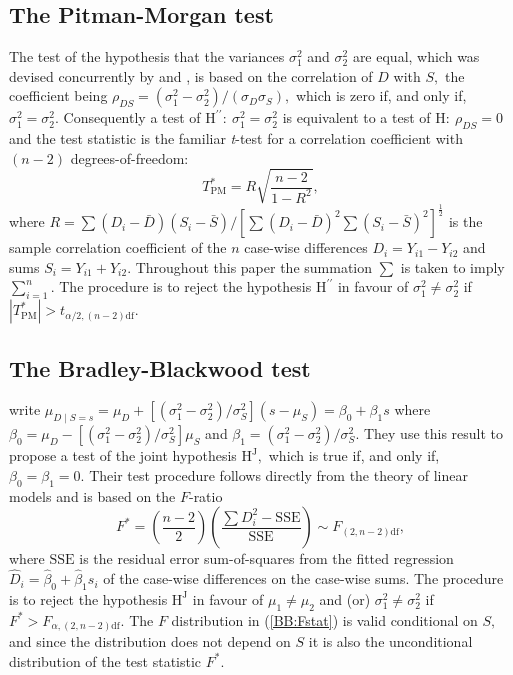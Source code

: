 \documentclass[12pt, a4paper]{report}
\theoremstyle{plain}
\theoremstyle{definition}
\theoremstyle{remark}
\begin{document}
\subsection{The Pitman-Morgan test}

The test of the hypothesis that the variances $\sigma^2_1$ and $\sigma^2_2$ are equal, which was devised concurrently by \cite{Pit39} and \cite{Morgan39}, is based on the correlation of $D$ with $S,$ the coefficient being $\rho_{DS} = (\sigma^2_1 - \sigma^2_2) / (\sigma_D \sigma_S ),$ which is zero if, and only if, $\sigma^2_1 = \sigma^2_2.$ Consequently a test of $\textrm{H}^{\prime\prime}\colon\ \sigma^2_1 = \sigma^2_2$ is equivalent to a test of $\textrm{H}\colon\ \rho_{DS}=0$ and the test statistic is the familiar {\it t}-test for a correlation coefficient with $(n-2)$ degrees-of-freedom:  
\[
T^*_\mathrm{PM} = R \sqrt{ \frac{n-2}{1-R^2} },
\]
where $R =  \sum (D_i-\bar{D})(S_i-\bar{S}) / [ \sum(D_i-\bar{D})^2 \sum (S_i-\bar{S})^2 ]^{\frac{1}{2}} $ 
is the sample correlation coefficient of the $n$ case-wise differences $D_i = Y_{i1} - Y_{i2}$ and sums $S_i = Y_{i1} + Y_{i2}.$ Throughout this paper the summation $\sum$ is taken to imply $\sum_{i=1}^n.$  The procedure is to reject the hypothesis $\textrm{H}^{\prime\prime}$ in favour of $\sigma^2_1\neq\sigma^2_2$ if $|T^*_\mathrm{PM}| >  t_{\alpha/2,(n-2)\textrm{df}}.$ 

\subsection{The Bradley-Blackwood test}

\cite{BB89} write $\mu_{D \mid S=s} = \mu_D + [ ( \sigma^2_1 - \sigma^2_2) / \sigma^2_S ] (s - \mu_S) = \beta_0 + \beta_1 s$ where $\beta_0=\mu_D- [(\sigma^2_1-\sigma^2_2)/ \sigma^2_S] \mu_S$ and $\beta_1 = (\sigma^2_1 - \sigma^2_2 )/ \sigma^2_S.$ They use this result to propose a test of the joint hypothesis $\textrm{H}^\mathrm{J},$ which is true if, and only if, $\beta_0=\beta_1=0.$ Their test procedure follows directly from the theory of linear models \citep[for example]{Hogg} and is based on the $F$-ratio
\begin{equation}\label{BB:Fstat}
F^* = (\frac{n-2}{2}) (\frac{\sum {D_i^2} - \mathrm{SSE}}{\mathrm{SSE}}) \sim F_{(2,n-2)\textrm{df}} ,
\end{equation}
where $\mathrm{SSE}$ is the residual error sum-of-squares from the fitted regression $\hat{D}_i=\hat{\beta}_0 +\hat{\beta}_1 s_i$ of the case-wise differences on the case-wise sums. The procedure is to reject the hypothesis $\textrm{H}^\mathrm{J}$ in favour of $\mu_1\neq\mu_2$ and (or) $\sigma^2_1\neq\sigma^2_2$ if $F^* >  F_{\alpha,(2,n-2)\textrm{df}}.$ The $F$ distribution in (\ref{BB:Fstat}) is valid conditional on $S,$ and since the distribution does not depend on $S$ it is also the unconditional distribution of the test statistic $F^*.$ 
\end{document}
